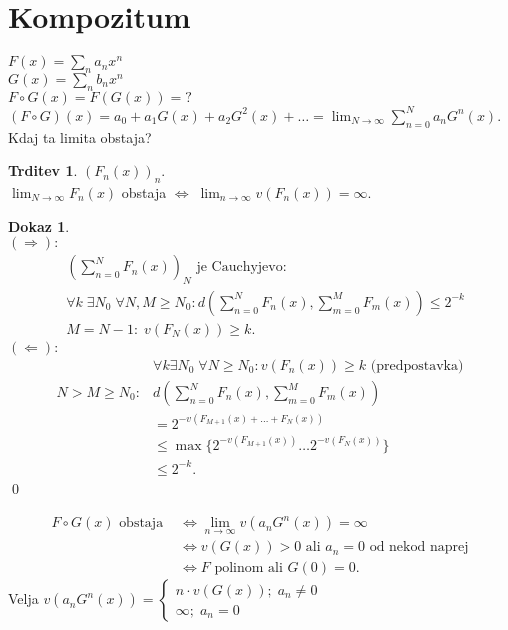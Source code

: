 \documentclass[a4paper, 12pt]{book}
\theoremstyle{definition}
\newtheorem{claim}[counter]{Trditev}
\newtheorem{pro}[counter]{Dokaz}
\theoremstyle{remark}
\begin{document}
\section{Kompozitum}

$F(x) = \sum_n a_n x^n$ \\
$G(x) = \sum_n b_n x^n$ \\
$F \circ G(x) = F(G(x)) = ?$ \\
$(F \circ G)(x) = a_0 + a_1 G(x) + a_2 G^2(x) + \dots = \lim_{N \to \infty} \sum_{n=0}^{N} a_n G^n(x)$. \\
Kdaj ta limita obstaja?
\begin{claim}
  $(F_n(x))_n$. \\
  $\lim_{N \to \infty} F_n(x)$ obstaja $\iff \; \lim_{n \to \infty} v\left(F_n(x)\right) = \infty$.
\end{claim}
\begin{pro} \text{} \\
  $(\Longrightarrow):$
  \begin{align*}
    &\left(\sum_{n=0}^{N} F_n(x)\right)_N \text{ je Cauchyjevo}: \\
    &\forall k \; \exists N_0 \; \forall N,M \geq N_0: d\left(\sum_{n=0}^{N} F_n(x), \sum_{m=0}^{M} F_m(x)\right) \leq 2^{-k} \\
    &M = N-1: \; v\left(F_N(x)\right) \geq k.
  \end{align*}
  $(\Longleftarrow):$
  \begin{align*}
    &\forall k \exists N_0 \; \forall N \geq N_0: v\left(F_n(x)\right) \geq k \text{ (predpostavka)} \\
    N > M \geq N_0: &d\left(\sum_{n=0}^{N} F_n(x), \sum_{m=0}^{M} F_m(x)\right) \\
    &= 2^{-v(F_{M+1}(x) + \dots + F_N(x))} \\
    &\leq \max \{2^{-v(F_{M+1}(x))} \dots 2^{-v(F_N(x))}\} \\
    &\leq 2^{-k}.
  \end{align*}
  \qed
\end{pro}
\begin{align*}
  F \circ G(x) \text{ obstaja } &\iff \lim_{n \to \infty} v\left(a_n G^n(x)\right) = \infty \\
  &\iff v(G(x)) > 0 \text{ ali } a_n = 0 \text{ od nekod naprej} \\
  &\iff F \text{ polinom ali } G(0) = 0.
\end{align*}
Velja $v\left(a_n G^n(x)\right) = \begin{cases}
  n \cdot v(G(x)); \; a_n \neq 0 \\
  \infty; \; a_n = 0
\end{cases}$
\end{document}
